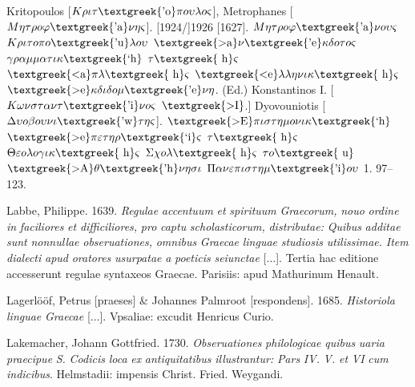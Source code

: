 \documentclass[output=paper]{langsci/langscibook}
\begin{document}
Kritopoulos [$K\rho \iota \tau \text{\textgreek{'o}}\pi o\upsilon \lambda o\varsigma $], Metrophanes [$M\eta \tau \rho o\varphi \text{\textgreek{'a}}\nu \eta \varsigma $]. [1924/]1926 [1627]. $M\eta \tau \rho o\varphi \text{\textgreek{'a}}\nu o\upsilon \varsigma $ $K\rho \iota \tau o\pi o\text{\textgreek{'u}}\lambda o\upsilon $ $\text{\textgreek{>a}}\nu \text{\textgreek{'e}}\kappa \delta o\tau o\varsigma $ $\gamma \rho \alpha \mu \mu \alpha \tau \iota \kappa \text{\textgreek{`h}}$ $\tau \text{\textgreek{~h}}\varsigma $ $\text{\textgreek{<a}}\pi \lambda \text{\textgreek{~h}}\varsigma $ $\text{\textgreek{<e}}\lambda \lambda \eta \nu \iota \kappa \text{\textgreek{~h}}\varsigma $ $\text{\textgreek{>e}}\kappa \delta \iota \delta o\mu \text{\textgreek{'e}}\nu \eta $. (Ed.) Konstantinos I. [$K\omega \nu \sigma \tau \alpha \nu \tau \text{\textgreek{'i}}\nu o\varsigma $ $\text{\textgreek{>I}}$.] Dyovouniotis [$\Delta \upsilon o\beta o\upsilon \nu \iota \text{\textgreek{'w}}\tau \eta \varsigma $]. \textit{$\text{\textgreek{>E}}\pi \iota \sigma \tau \eta \mu o\nu \iota \kappa \text{\textgreek{`h}}$ $\text{\textgreek{>e}}\pi \varepsilon \tau \eta \rho \text{\textgreek{`i}}\varsigma $ $\tau \text{\textgreek{~h}}\varsigma $ $\Theta \varepsilon o\lambda o\gamma \iota \kappa \text{\textgreek{~h}}\varsigma $ $\Sigma \chi o\lambda \text{\textgreek{~h}}\varsigma $ $\tau o\text{\textgreek{~u}}$ $\text{\textgreek{>A}}\theta \text{\textgreek{'h}}\nu \eta \sigma \iota $ $\Pi \alpha \nu \varepsilon \pi \iota \sigma \tau \eta \mu \text{\textgreek{'i}}o\upsilon $} 1. 97–123.

Labbe, Philippe. 1639. \textit{Regulae} \textit{accentuum} \textit{et} \textit{spirituum} \textit{Graecorum,} \textit{nouo} \textit{ordine} \textit{in} \textit{faciliores} \textit{et} \textit{difficiliores,} \textit{pro} \textit{captu} \textit{scholasticorum,} \textit{distributae:} \textit{Quibus} \textit{additae} \textit{sunt} \textit{nonnullae} \textit{obseruationes,} \textit{omnibus} \textit{Graecae} \textit{linguae} \textit{studiosis} \textit{utilissimae.} \textit{Item} \textit{dialecti} \textit{apud} \textit{oratores} \textit{usurpatae} \textit{a} \textit{poeticis} \textit{seiunctae} [...]. Tertia hac editione accesserunt regulae syntaxeos Graecae. Parisiis: apud Mathurinum Henault.

Lagerlööf, Petrus [praeses] \& Johannes Palmroot [respondens]. 1685. \textit{Historiola} \textit{linguae} \textit{Graecae} [...]. Vpsaliae: excudit Henricus Curio.

Lakemacher, Johann Gottfried. 1730. \textit{Obseruationes} \textit{philologicae} \textit{quibus} \textit{uaria} \textit{praecipue} \textit{S.} \textit{Codicis} \textit{loca} \textit{ex} \textit{antiquitatibus} \textit{illustrantur:} \textit{Pars} \textit{IV.} \textit{V.} \textit{et} \textit{VI} \textit{cum} \textit{indicibus}. Helmstadii: impensis Christ. Fried. Weygandi.
\end{document}
